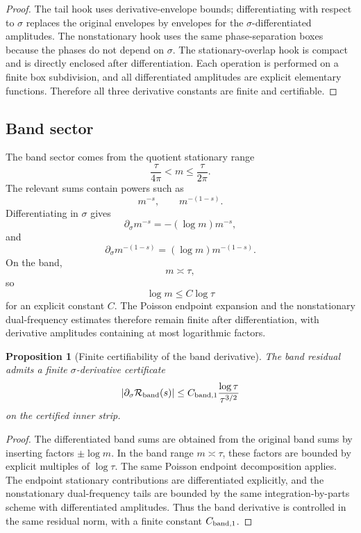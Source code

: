 \documentclass[11pt]{article}
\newtheorem{proposition}[theorem]{Proposition}
\begin{document}
\begin{proof}
The tail hook uses derivative-envelope bounds; differentiating with respect to
\(\sigma\) replaces the original envelopes by envelopes for the
\(\sigma\)-differentiated amplitudes.  The nonstationary hook uses the same
phase-separation boxes because the phases do not depend on \(\sigma\).  The
stationary-overlap hook is compact and is directly enclosed after
differentiation.  Each operation is performed on a finite box subdivision, and
all differentiated amplitudes are explicit elementary functions.  Therefore
all three derivative constants are finite and certifiable.
\end{proof}

\subsection{Band sector}

The band sector comes from the quotient stationary range
\[
        \frac{\tau}{4\pi}<m\le\frac{\tau}{2\pi}.
\]
The relevant sums contain powers such as
\[
        m^{-s},
        \qquad
        m^{-(1-s)}.
\]
Differentiating in \(\sigma\) gives
\[
        \partial_\sigma m^{-s}
        =
        -(\log m)m^{-s},
\]
and
\[
        \partial_\sigma m^{-(1-s)}
        =
        (\log m)m^{-(1-s)}.
\]
On the band,
\[
        m\asymp \tau,
\]
so
\[
        \log m\le C\log\tau
\]
for an explicit constant \(C\).  The Poisson endpoint expansion and the
nonstationary dual-frequency estimates therefore remain finite after
differentiation, with derivative amplitudes containing at most logarithmic
factors.

\begin{proposition}[Finite certifiability of the band derivative]
\label{prop:band-derivative-certifiable}
The band residual admits a finite \(\sigma\)-derivative certificate
\[
        |\partial_\sigma\mathcal R_{\rm band}(s)|
        \le
        C_{{\rm band},1}
        \frac{\log\tau}{\tau^{3/2}}
\]
on the certified inner strip.
\end{proposition}

\begin{proof}
The differentiated band sums are obtained from the original band sums by
inserting factors \(\pm\log m\).  In the band range \(m\asymp\tau\), these
factors are bounded by explicit multiples of \(\log\tau\).  The same Poisson
endpoint decomposition applies.  The endpoint stationary contributions are
differentiated explicitly, and the nonstationary dual-frequency tails are
bounded by the same integration-by-parts scheme with differentiated
amplitudes.  Thus the band derivative is controlled in the same residual norm,
with a finite constant \(C_{{\rm band},1}\).
\end{proof}
\end{document}
